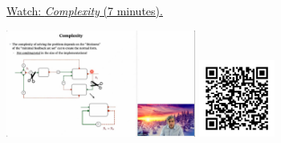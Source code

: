 
\begin{minipage}{10cm}
    \href{https://act4e-spring21.netlify.app/videos/spring2021-functorial-comp-b:solving-queries:complexity.html}{Watch: \emph{Complexity} (7 minutes).}
        
    \href{https://act4e-spring21.netlify.app/videos/spring2021-functorial-comp-b:solving-queries:complexity.html}{\includegraphics[height=3.5cm]{spring2021-functorial-comp-b:solving-queries:complexity/thumbnails.jpg}}
    \href{https://act4e-spring21.netlify.app/videos/spring2021-functorial-comp-b:solving-queries:complexity.html}{\includegraphics[height=2.5cm]{spring2021-functorial-comp-b:solving-queries:complexity/qrcode.png}}
\end{minipage}
